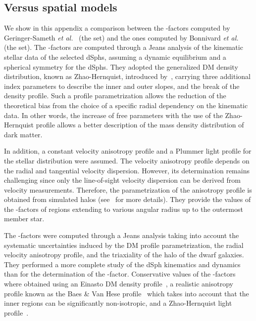 \subsection{\GS Versus \B spatial models}\label{sec:gd_gsVb}

We show in this appendix a comparison between the \J-factors computed by Geringer-Sameth \emph{et al.}~\cite{Geringer-Sameth:2014yza} (the \GS set) and the ones computed by Bonnivard \emph{et al.}~\cite{Bonnivard:2014kza, Bonnivard:2015xpq} (the \B set).
%
The \GS \J-factors are computed through a Jeans analysis of the kinematic stellar data of the  selected dSphs, assuming a dynamic equilibrium and a spherical symmetry for the dSphs.
They adopted the generalized DM density distribution, known as Zhao-Hernquist, introduced by~\cite{Zhao:1995cp}, carrying three additional index parameters to describe the inner and outer slopes, and the break of the density profile.
Such a profile parametrization allows the reduction of the theoretical bias from the choice of a specific radial dependency on the kinematic data.
In other words, the increase of free parameters with the use of the  Zhao-Hernquist profile allows a better description of the mass density distribution of dark matter.

In addition, a constant velocity anisotropy profile and a Plummer light profile \cite{10.1093/mnras/71.5.460} for the stellar distribution were assumed.
The velocity anisotropy profile depends on the radial and tangential velocity dispersion.
However, its determination remains challenging since only the line-of-sight velocity dispersion can be derived from velocity measurements.
Therefore, the parametrization of the anisotropy profile is obtained from simulated halos (see~\cite{Hunter:2013vua} for more details).
They provide the values of the \J-factors of regions extending to various angular radius up to the outermost member star.

The \B \J-factors were computed through a Jeans analysis taking into account the systematic uncertainties induced by the DM profile parametrization, the radial velocity anisotropy profile, and the triaxiality of the halo of the dwarf galaxies.
They performed a more complete study of the dSph kinematics and dynamics than \GS for the determination of the \J-factor.
Conservative values of the \J-factors where obtained using an Einasto DM density profile~\cite{Dhar_2010}, a realistic anisotropy profile known as the Baes \& Van Hese profile~\cite{Baes:2007tx} which takes into account that the inner regions can be significantly non-isotropic, and a Zhao-Hernquist light profile~\cite{Zhao:1995cp}.

